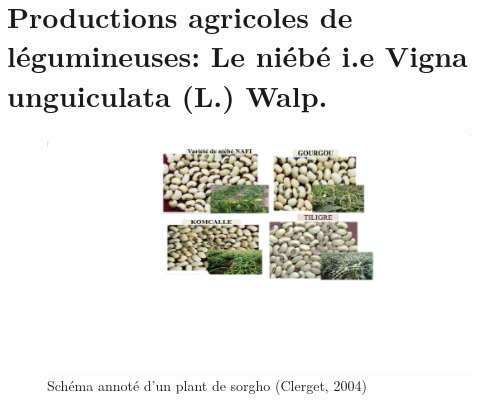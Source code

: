 \documentclass[a4paper,11pt]{article}
\begin{document}

\section{Productions agricoles de légumineuses: Le niébé i.e Vigna unguiculata (L.) Walp.}
\begin{figure}%
  \begin{center}
    \includegraphics[width=18cm]{images/VariétésdeNiébéauBF}
  \end{center}
\caption{Schéma annoté d’un plant de sorgho (Clerget, 2004)}
\end{figure}

\end{document}
